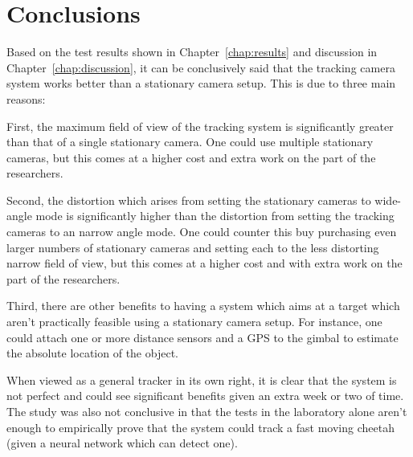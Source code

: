 \chapter{Conclusions}

Based on the test results shown in Chapter~\ref{chap:results} and discussion in Chapter~\ref{chap:discussion}, it can be conclusively said that the tracking camera system works better than a stationary camera setup. This is due to three main reasons:

First, the maximum field of view of the tracking system is significantly greater than that of a single stationary camera. One could use multiple stationary cameras, but this comes at a higher cost and extra work on the part of the researchers.

Second, the distortion which arises from setting the stationary cameras to wide-angle mode is significantly higher than the distortion from setting the tracking cameras to an narrow angle mode. One could counter this buy purchasing even larger numbers of stationary cameras and setting each to the less distorting narrow field of view, but this comes at a higher cost and with extra work on the part of the researchers.

Third, there are other benefits to having a system which aims at a target which aren't practically feasible using a stationary camera setup. For instance, one could attach one or more distance sensors and a GPS to the gimbal to estimate the absolute location of the object.

When viewed as a general tracker in its own right, it is clear that the system is not perfect and could see significant benefits given an extra week or two of time. The study was also not conclusive in that the tests in the laboratory alone aren't enough to empirically prove that the system could track a fast moving cheetah (given a neural network which can detect one). 
